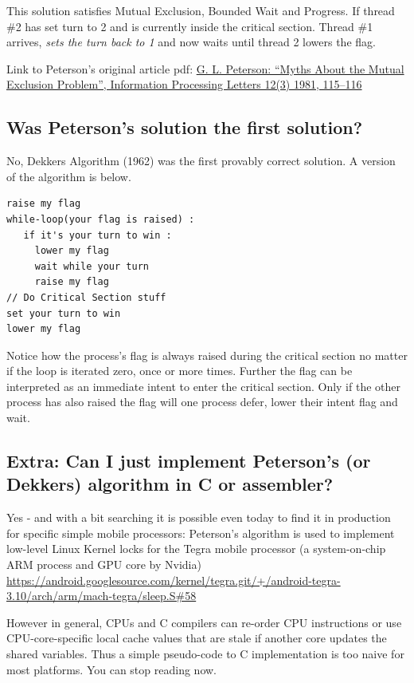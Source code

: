 This solution satisfies Mutual Exclusion, Bounded Wait and Progress.
If thread \#2 has set turn to 2 and is currently inside the critical section.
Thread \#1 arrives, \emph{sets the turn back to 1} and now waits until thread 2 lowers the flag.

Link to Peterson's original article pdf: \href{http://dl.acm.org/citation.cfm?id=945527}{G. L. Peterson: ``Myths About the Mutual Exclusion Problem'', Information Processing Letters 12(3) 1981, 115--116}

\subsection{Was Peterson's solution the first solution?}\label{was-petersons-solution-the-first-solution}

No, Dekkers Algorithm (1962) was the first provably correct solution. A version of the algorithm is below.

\begin{lstlisting}
raise my flag
while-loop(your flag is raised) :
   if it's your turn to win :
     lower my flag
     wait while your turn
     raise my flag
// Do Critical Section stuff
set your turn to win
lower my flag
\end{lstlisting}

Notice how the process's flag is always raised during the critical section no matter if the loop is iterated zero, once or more times. Further the flag can be interpreted as an immediate intent to enter the critical section. Only if the other process has also raised the flag will one process defer, lower their intent flag and wait.

\subsection{Extra: Can I just implement Peterson's (or Dekkers) algorithm in C or assembler?}

Yes - and with a bit searching it is possible even today to find it in production for specific simple mobile processors: Peterson's algorithm is used to implement low-level Linux Kernel locks for the Tegra mobile processor (a system-on-chip ARM process and GPU core by Nvidia) \href{Link to Lock Source}{https://android.googlesource.com/kernel/tegra.git/+/android-tegra-3.10/arch/arm/mach-tegra/sleep.S\#58}

However in general, CPUs and C compilers can re-order CPU instructions or use CPU-core-specific local cache values that are stale if another core updates the shared variables. Thus a simple pseudo-code to C implementation is too naive for most platforms. You can stop reading now.

